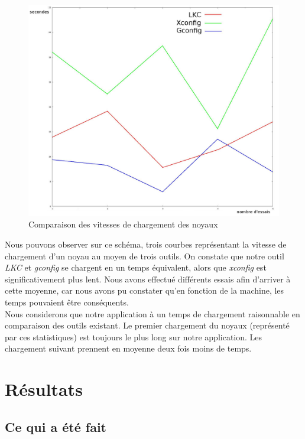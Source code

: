 \documentclass[17pts]{report}
\begin{document}
\begin{figure}[H]
    \includegraphics[scale=0.4]{./illustrations/speed_cmp.jpeg}
    \centering
    \caption{Comparaison des vitesses de chargement des noyaux}
    \label{fig:VitesseChargement}
\end{figure}
Nous pouvons observer sur ce schéma, trois courbes représentant la vitesse
de chargement d'un noyau au moyen de trois outils.
On constate que notre outil \textit{LKC} et \textit{gconfig} se chargent en un
temps équivalent, alors que \textit{xconfig} est significativement plus lent.
Nous avons effectué différents essais afin d'arriver à cette moyenne, car nous
avons pu constater qu'en fonction de la machine, les temps pouvaient être
conséquents. \\
Nous considerons que notre application à un temps de chargement raisonnable
en comparaison des outils existant. Le premier chargement du noyaux (représenté
par ces statistiques) est toujours le plus long sur notre application. Les
chargement suivant prennent en moyenne deux fois moins de temps.

\chapter{Résultats}
\label{cha:Résultats}
    \section{Ce qui a été fait}
    \label{sec:Ce qui a été fait}
\end{document}
